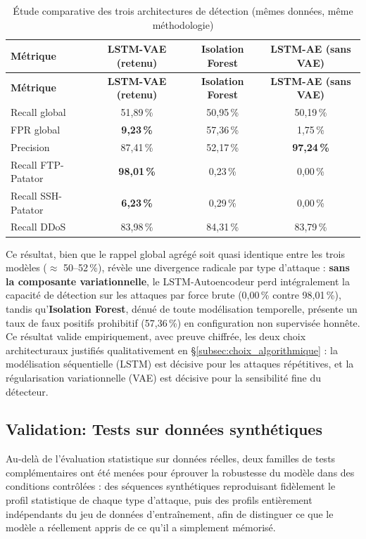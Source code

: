 \renewcommand{\arraystretch}{1.25}
\small
\begin{xltabular}{\textwidth}{|>{\raggedright\arraybackslash}X|c|c|c|}

\caption{Étude comparative des trois architectures de détection (mêmes données, même méthodologie)}
\label{tab:comparaison_modeles} \\

\hline
{}
\textbf{Métrique} & \textbf{LSTM-VAE (retenu)} & \textbf{Isolation Forest} & \textbf{LSTM-AE (sans VAE)} \\ \hline
\endfirsthead

\hline
{}
\textbf{Métrique} & \textbf{LSTM-VAE (retenu)} & \textbf{Isolation Forest} & \textbf{LSTM-AE (sans VAE)} \\ \hline
\endhead

Recall global & 51,89\,\% & 50,95\,\% & 50,19\,\% \\ \hline
FPR global & \textbf{9,23\,\%} & 57,36\,\% & 1,75\,\% \\ \hline
Precision & 87,41\,\% & 52,17\,\% & \textbf{97,24\,\%} \\ \hline
Recall FTP-Patator & \textbf{98,01\,\%} & 0,23\,\% & 0,00\,\% \\ \hline
Recall SSH-Patator & \textbf{6,23\,\%} & 0,29\,\% & 0,00\,\% \\ \hline
Recall DDoS & 83,98\,\% & 84,31\,\% & 83,79\,\% \\ \hline

\end{xltabular}

Ce résultat, bien que le rappel global agrégé soit quasi identique entre les trois modèles ($\approx$ 50--52\,\%), révèle une divergence radicale par type d'attaque : \textbf{sans la composante variationnelle}, le LSTM-Autoencodeur perd intégralement la capacité de détection sur les attaques par force brute (0,00\,\% contre 98,01\,\%), tandis qu'\textbf{Isolation Forest}, dénué de toute modélisation temporelle, présente un taux de faux positifs prohibitif (57,36\,\%) en configuration non supervisée honnête. Ce résultat valide empiriquement, avec preuve chiffrée, les deux choix architecturaux justifiés qualitativement en \S\ref{subsec:choix_algorithmique} : la modélisation séquentielle (LSTM) est décisive pour les attaques répétitives, et la régularisation variationnelle (VAE) est décisive pour la sensibilité fine du détecteur.


\subsection{Validation: Tests sur données synthétiques}
\label{subsec:limites_generalisation}
Au-delà de l'évaluation statistique sur données réelles, deux familles de tests complémentaires ont été menées pour éprouver la robustesse du modèle dans des conditions contrôlées : des séquences synthétiques reproduisant fidèlement le profil statistique de chaque type d'attaque, puis des profils entièrement indépendants du jeu de données d'entraînement, afin de distinguer ce que le modèle a réellement appris de ce qu'il a simplement mémorisé.

